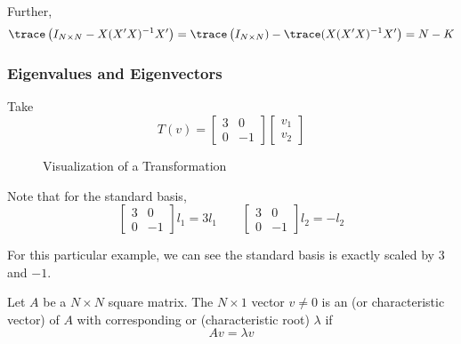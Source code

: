 \documentclass{article}
\begin{document}
Further,
\[
  \trace\left(I_{N \times N} - X (X^\prime X)^{-1} X^\prime\right)
  =
  \trace\left(I_{N \times N}) - \trace(X (X^\prime X)^{-1} X^\prime\right)
  =
  N - K
\]

\subsubsection{Eigenvalues and Eigenvectors}
\label{ssub:eigenvalues_and_eigenvectors}

Take
\[
  T(v) =
  \left[\begin{matrix}
    3 & 0 \\ 0 & -1
  \end{matrix}\right]
  \left[\begin{matrix}
    v_1 \\ v_2
  \end{matrix}\right]
\]

\begin{figure}[!ht]
  \centering
  \caption{Visualization of a Transformation}
  \label{fig:visualization_of_a_transformation}
\end{figure}

Note that for the standard basis,
\[
  \left[\begin{matrix}
    3 & 0 \\ 0 & -1
  \end{matrix}\right]
  l_1
  =
  3l_1
  \quad\quad
  \left[\begin{matrix}
    3 & 0 \\ 0 & -1
  \end{matrix}\right]
  l_2
  =
  -l_2
\]

For this particular example, we can see the standard basis is exactly scaled by $3$ and $-1$.
\begin{definition}
  Let $A$ be a $N \times N$ square matrix. The $N \times 1$ vector $v \ne 0$ is an  (or characteristic vector) of $A$ with corresponding  or (characteristic root) $\lambda$ if
  \[
    A v = \lambda v
  \]
\end{definition}
\end{document}
